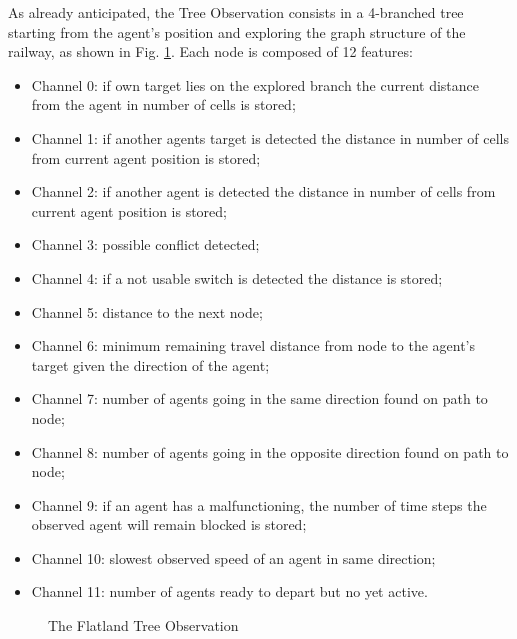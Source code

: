 \documentclass[a4paper, 12pt]{article}
\numberwithin{equation}{section}
\begin{document}
As already anticipated, the Tree Observation consists in a 4-branched tree starting from the agent's position and exploring the graph structure of the railway, as shown in Fig. \ref{fig:tree}. Each node is composed of 12 features:
\begin{itemize}
	\item Channel 0: if own target lies on the explored branch the current distance from the agent in number of cells is stored; 
	\item Channel 1: if another agents target is detected the distance in number of cells from current agent position is stored;
	\item Channel 2: if another agent is detected the distance in number of cells from current agent position is stored;
	\item Channel 3: possible conflict detected;
	\item Channel 4: if a not usable switch is detected the distance is stored;
	\item Channel 5: distance to the next node;
	\item Channel 6: minimum remaining travel distance from node to the agent’s target given the direction of the agent;
	\item Channel 7: number of agents going in the same direction found on path to node;
	\item Channel 8: number of agents going in the opposite direction found on path to node;
	\item Channel 9: if an agent has a malfunctioning, the number of time steps the observed agent will remain blocked is stored;
	\item Channel 10: slowest observed speed of an agent in same direction;
	\item Channel 11: number of agents ready to depart but no yet active.
\end{itemize}

\begin{figure}[h]
	\centering
		\caption{The Flatland Tree Observation}
	\label{fig:tree}
\end{figure}
\end{document}
